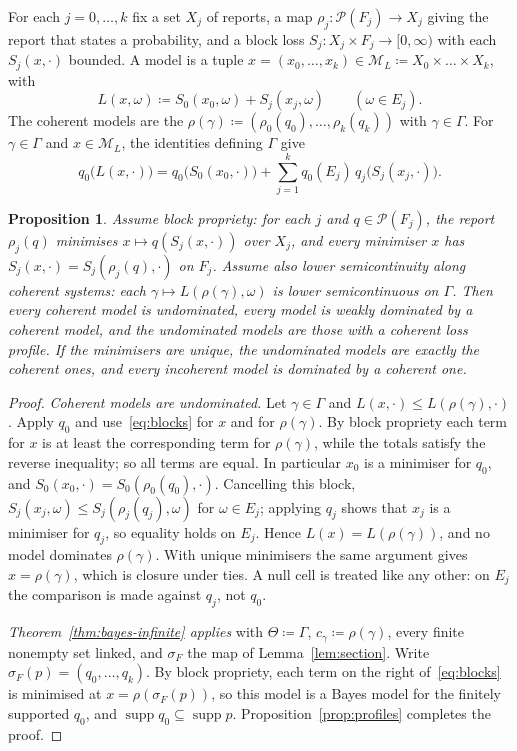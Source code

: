 \documentclass[11pt]{article}
\newtheorem{proposition}[theorem]{Proposition}
\theoremstyle{definition}
\theoremstyle{remark}
\newcommand{\M}{\mathcal M}
\newcommand{\PP}{\mathcal P}
\newcommand{\supp}{\operatorname{supp}}
\begin{document}
For each $j=0,\dots,k$ fix a set $X_j$ of reports, a map $\rho_j:\PP(F_j)\to X_j$ giving the report that states a probability, and a block loss $S_j:X_j\times F_j\to[0,\infty)$ with each $S_j(x,\cdot)$ bounded. A model is a tuple $x=(x_0,\dots,x_k)\in\M_L\coloneqq X_0\times\dots\times X_k$, with
\[
L(x,\omega)\coloneqq S_0(x_0,\omega)+S_j(x_j,\omega)\qquad(\omega\in E_j).
\]
The coherent models are the $\rho(\gamma)\coloneqq(\rho_0(q_0),\dots,\rho_k(q_k))$ with $\gamma\in\Gamma$. For $\gamma\in\Gamma$ and $x\in\M_L$, the identities defining $\Gamma$ give
\begin{equation}\label{eq:blocks}
q_0\bigl(L(x,\cdot)\bigr)=q_0\bigl(S_0(x_0,\cdot)\bigr)+\sum_{j=1}^kq_0(E_j)\,q_j\bigl(S_j(x_j,\cdot)\bigr).
\end{equation}

\begin{proposition}\label{prop:blocks}
Assume \emph{block propriety}: for each $j$ and $q\in\PP(F_j)$, the report $\rho_j(q)$ minimises $x\mapsto q(S_j(x,\cdot))$ over $X_j$, and every minimiser $x$ has $S_j(x,\cdot)=S_j(\rho_j(q),\cdot)$ on $F_j$. Assume also \emph{lower semicontinuity along coherent systems}: each $\gamma\mapsto L(\rho(\gamma),\omega)$ is lower semicontinuous on $\Gamma$. Then every coherent model is undominated, every model is weakly dominated by a coherent model, and the undominated models are those with a coherent loss profile. If the minimisers are unique, the undominated models are exactly the coherent ones, and every incoherent model is dominated by a coherent one.
\end{proposition}
\begin{proof}
\emph{Coherent models are undominated.} Let $\gamma\in\Gamma$ and $L(x,\cdot)\le L(\rho(\gamma),\cdot)$. Apply $q_0$ and use~\eqref{eq:blocks} for $x$ and for $\rho(\gamma)$. By block propriety each term for $x$ is at least the corresponding term for $\rho(\gamma)$, while the totals satisfy the reverse inequality; so all terms are equal. In particular $x_0$ is a minimiser for $q_0$, and $S_0(x_0,\cdot)=S_0(\rho_0(q_0),\cdot)$. Cancelling this block, $S_j(x_j,\omega)\le S_j(\rho_j(q_j),\omega)$ for $\omega\in E_j$; applying $q_j$ shows that $x_j$ is a minimiser for $q_j$, so equality holds on $E_j$. Hence $L(x)=L(\rho(\gamma))$, and no model dominates $\rho(\gamma)$. With unique minimisers the same argument gives $x=\rho(\gamma)$, which is closure under ties. A null cell is treated like any other: on $E_j$ the comparison is made against $q_j$, not $q_0$.

\emph{Theorem~\ref{thm:bayes-infinite} applies} with $\Theta\coloneqq\Gamma$, $c_\gamma\coloneqq\rho(\gamma)$, every finite nonempty set linked, and $\sigma_F$ the map of Lemma~\ref{lem:section}. Write $\sigma_F(p)=(q_0,\dots,q_k)$. By block propriety, each term on the right of~\eqref{eq:blocks} is minimised at $x=\rho(\sigma_F(p))$, so this model is a Bayes model for the finitely supported $q_0$, and $\supp q_0\subseteq\supp p$. Proposition~\ref{prop:profiles} completes the proof.
\end{proof}
\end{document}
